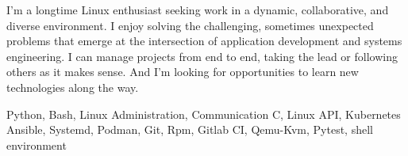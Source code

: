 
\begin{cvparagraph}
  I'm a longtime Linux enthusiast seeking work in a dynamic, collaborative, and diverse environment.
  I enjoy solving the challenging, sometimes unexpected problems that emerge at the intersection of application development and systems engineering.
  I can manage projects from end to end, taking the lead or following others as it makes sense.
  And I'm looking for opportunities to learn new technologies along the way.
\end{cvparagraph}

\begin{cvbox}
\begin{cvskills}
   {Python, Bash, Linux Administration, Communication}
   {C, Linux API, Kubernetes}
   {Ansible, Systemd, Podman, Git, Rpm, Gitlab CI, Qemu-Kvm, Pytest, shell environment}
\end{cvskills}
\end{cvbox}
